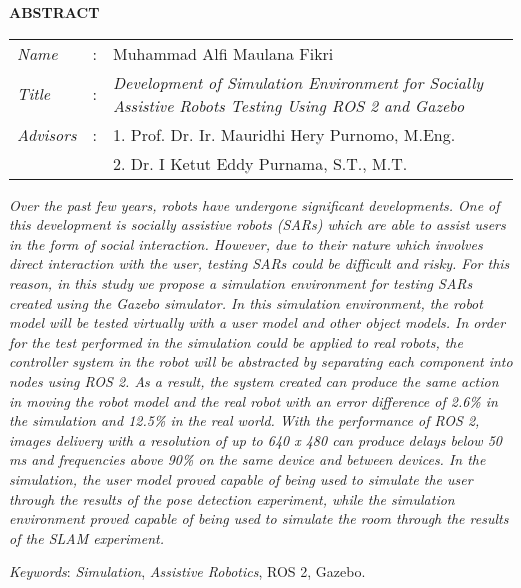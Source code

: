\begin{center}
  \large\textbf{ABSTRACT}
\end{center}

\vspace{2ex}

\begingroup
  \setlength{\tabcolsep}{0pt}
  \noindent
  \begin{tabularx}{\textwidth}{l >{\centering}m{2em} X}
    \emph{Name}     &:& Muhammad Alfi Maulana Fikri \\
    \emph{Title}    &:&	\emph{Development of Simulation Environment for Socially Assistive Robots Testing Using ROS 2 and Gazebo} \\
    \emph{Advisors} &:& 1. Prof. Dr. Ir. Mauridhi Hery Purnomo, M.Eng. \\
                    & & 2. Dr. I Ketut Eddy Purnama, S.T., M.T. \\
  \end{tabularx}
\endgroup

\emph{
  Over the past few years,
    robots have undergone significant developments.
  One of this development is socially assistive robots (SARs) which are able to assist users in the form of social interaction.
  However,
    due to their nature which involves direct interaction with the user,
    testing SARs could be difficult and risky.
  For this reason,
    in this study we propose a simulation environment for testing SARs created using the Gazebo simulator.
  In this simulation environment,
    the robot model will be tested virtually with a user model and other object models.
  In order for the test performed in the simulation could be applied to real robots,
    the controller system in the robot will be abstracted by separating each component into nodes using ROS 2.
  As a result,
    the system created can produce the same action in moving the robot model and the real robot with an error difference of 2.6\% in the simulation and 12.5\% in the real world.
  With the performance of ROS 2,
    images delivery with a resolution of up to 640 x 480 can produce delays below 50 ms and frequencies above 90\% on the same device and between devices.
  In the simulation,
    the user model proved capable of being used to simulate the user through the results of the pose detection experiment,
    while the simulation environment proved capable of being used to simulate the room through the results of the SLAM experiment.
}

\emph{Keywords}: \emph{Simulation}, \emph{Assistive Robotics}, ROS 2, Gazebo.
